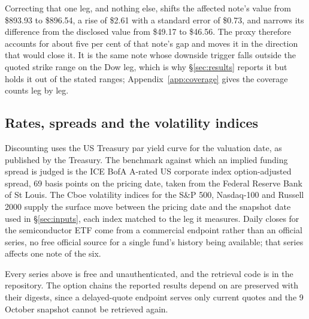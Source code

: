 Correcting that one leg, and nothing else, shifts the affected note's value from
\$893.93 to \$896.54, a rise of \$2.61 with a standard error of \$0.73, and
narrows its difference from the disclosed value from \$49.17 to \$46.56. The
proxy therefore accounts for about five per cent of that note's gap and moves it
in the direction that would close it. It is the same note whose downside trigger
falls outside the quoted strike range on the Dow leg, which is why
\S\ref{sec:results} reports it but holds it out of the stated ranges;
Appendix~\ref{app:coverage} gives the coverage counts leg by leg.

\subsection{Rates, spreads and the volatility indices}

Discounting uses the US Treasury par yield curve for the valuation date, as
published by the Treasury. The benchmark against which an implied funding spread
is judged is the ICE BofA A-rated US corporate index option-adjusted spread,
69 basis points on the pricing date, taken from the Federal Reserve Bank of St
Louis. The Cboe volatility indices for the S\&P 500, Nasdaq-100 and Russell
2000 supply the surface move between the pricing date and the snapshot date used
in \S\ref{sec:inputs}, each index matched to the leg it measures. Daily closes
for the semiconductor ETF come from a commercial endpoint rather than an
official series, no free official source for a single fund's history being
available; that series affects one note of the six.

Every series above is free and unauthenticated, and the retrieval code is in the
repository. The option chains the reported results depend on are preserved with
their digests, since a delayed-quote endpoint serves only current quotes and the
9 October snapshot cannot be retrieved again.
